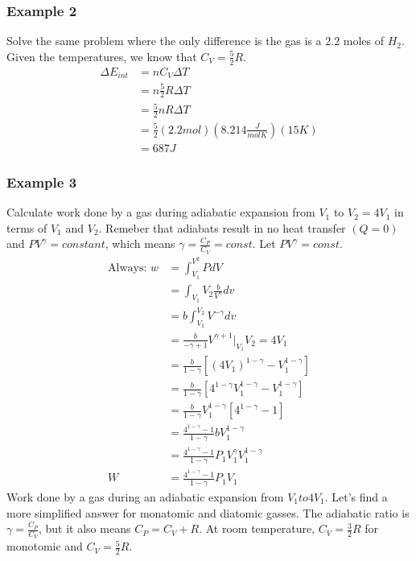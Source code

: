 	\subsubsection{Example 2}
	Solve the same problem where the only difference is the gas is a 2.2 moles of $H_2$. Given the temperatures, we know that $C_V=\frac{5}{2}R$.
	\begin{align*}
	\Delta E_{int}&=nC_V\Delta T\\
	&=n\frac{5}{2}R\Delta T\\
	&=\frac{5}{2}nR\Delta T\\
	&=\frac{5}{2}(2.2mol)(8.214\frac{J}{molK})(15K)\\
	&=687J
	\end{align*}
	\subsubsection{Example 3}
	Calculate work done by a gas during adiabatic expansion from $V_1$ to $V_2=4V_1$ in terms of $V_1$ and $V_2$. Remeber that adiabats result in no heat transfer $(Q=0)$ and $PV^\gamma{}=constant$, which means $\gamma{}=\frac{C_P}{C_V}=const$. Let $PV^\gamma{}=const$.
	\begin{align*}
	\text{Always: } w&=\int_{V_1}^{V^2}{PdV}\\
	&=\int_{V_1}{V_2}\frac{b}{V^\gamma}dv\\
	&=b\int_{V_1}^{V_2}{V^{-\gamma}}dv\\
	&=\frac{b}{-\gamma+1}V^{\gamma+1}|_{V_1}{V_2=4V_1}\\
	&=\frac{b}{1-\gamma}\left[(4V_1)^{1-\gamma}-V_1^{1-\gamma}\right]\\
	&=\frac{b}{1-\gamma}\left[4^{1-\gamma}V_1^{1-\gamma}-V_1^{1-\gamma}\right]\\
	&=\frac{b}{1-\gamma}V_1^{1-\gamma}\left[4^{1-\gamma}-1\right]\\
	&=\frac{4^{1-\gamma}-1}{1-\gamma}bV_1^{1-\gamma}\\
	&=\frac{4^{1-\gamma}-1}{1-\gamma}P_1V_1^{\gamma}V_1^{1-\gamma}\\
	W&=\frac{4^{1-\gamma}-1}{1-\gamma}P_1V_1
	\end{align*}
	Work done by a gas during an adiabatic expansion from $V_1to4V_1$. Let's find a more simplified answer for monatomic and diatomic gasses. The adiabatic ratio is $\gamma=\frac{C_P}{C_V}$, but it also means $C_P=C_V+R$. At room temperature, $C_V=\frac{3}{2}R$ for monotomic and $C_V=\frac{5}{2}R$.
